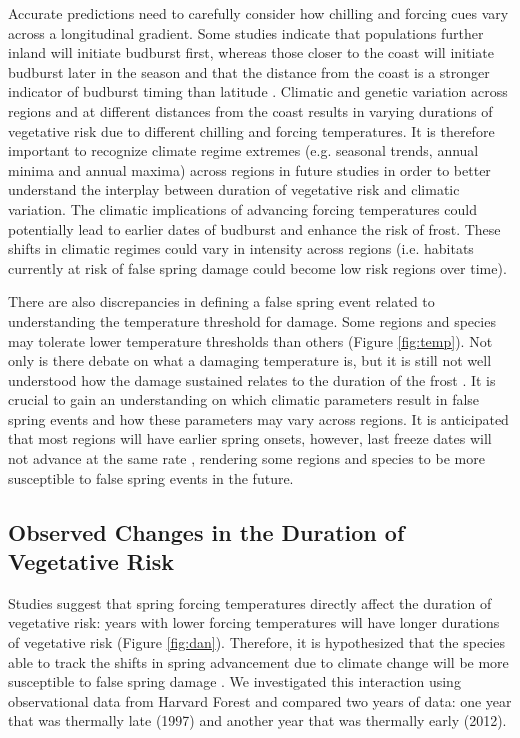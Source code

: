 \documentclass{article}\usepackage[]{graphicx}\usepackage[]{color}
\begin{document}
Accurate predictions need to carefully consider how chilling and forcing cues vary across a longitudinal gradient. Some studies indicate that populations further inland will initiate budburst first, whereas those closer to the coast will initiate budburst later in the season and that the distance from the coast is a stronger indicator of budburst timing than latitude \citep{Myking2007}. Climatic and genetic variation across regions and at different distances from the coast results in varying durations of vegetative risk due to different chilling and forcing temperatures. It is therefore important to recognize climate regime extremes (e.g. seasonal trends, annual minima and annual maxima) across regions in future studies in order to better understand the interplay between duration of vegetative risk and climatic variation. The climatic implications of advancing forcing temperatures could potentially lead to earlier dates of budburst and enhance the risk of frost. These shifts in climatic regimes could vary in intensity across regions (i.e. habitats currently at risk of false spring damage could become low risk regions over time). 

There are also discrepancies in defining a false spring event related to understanding the temperature threshold for damage. Some regions and species may tolerate lower temperature thresholds than others (Figure \ref{fig:temp}). Not only is there debate on what a damaging temperature is, but it is still not well understood how the damage sustained relates to the duration of the frost \citep{Sakai1987, Augspurger2009, Vitasse2014, Vitra2017}. It is crucial to gain an understanding on which climatic parameters result in false spring events and how these parameters may vary across regions. It is anticipated that most regions will have earlier spring onsets, however, last freeze dates will not advance at the same rate \citep{Inouye2008,Martin2010,Labe2016,Sgubin2018}, rendering some regions and species to be more susceptible to false spring events in the future. 

\subsection{Observed Changes in the Duration of Vegetative Risk}
Studies suggest that spring forcing temperatures directly affect the duration of vegetative risk: years with lower forcing temperatures will have longer durations of vegetative risk \citep{Donnelly2017} (Figure \ref{fig:dan}). Therefore, it is hypothesized that the species able to track the shifts in spring advancement due to climate change will be more susceptible to false spring damage \citep{Scheifinger2003}. We investigated this interaction using observational data from Harvard Forest \citep{Okeefe2014} and compared two years of data: one year that was thermally late (1997) and another year that was thermally early (2012).
\end{document}
